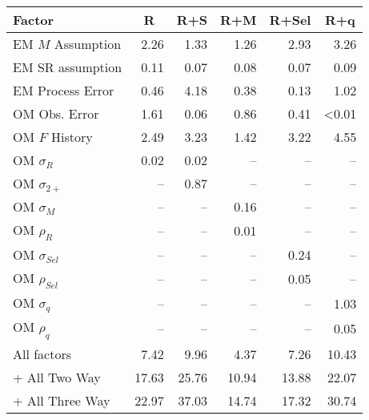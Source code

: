 \begin{center}
\begin{tabular}{lrrrrr}
\hline\hline
\multicolumn{1}{l}{Factor}&\multicolumn{1}{c}{R}&\multicolumn{1}{c}{R+S}&\multicolumn{1}{c}{R+M}&\multicolumn{1}{c}{R+Sel}&\multicolumn{1}{c}{R+q}\tabularnewline
\hline
EM $M$ Assumption& 2.26& 1.33& 1.26& 2.93& 3.26\tabularnewline
EM SR assumption& 0.11& 0.07& 0.08& 0.07& 0.09\tabularnewline
EM Process Error& 0.46& 4.18& 0.38& 0.13& 1.02\tabularnewline
OM Obs. Error& 1.61& 0.06& 0.86& 0.41&\textless  0.01\tabularnewline
OM $F$ History& 2.49& 3.23& 1.42& 3.22& 4.55\tabularnewline
OM $\sigma_R$& 0.02& 0.02&--&--&--\tabularnewline
OM $\sigma_{2+}$ &--& 0.87&--&--&--\tabularnewline
OM $\sigma_M$&--&--& 0.16&--&--\tabularnewline
OM $\rho_R$&--&--& 0.01&--&--\tabularnewline
OM $\sigma_{Sel}$&--&--&--& 0.24&--\tabularnewline
OM $\rho_{Sel}$&--&--&--& 0.05&--\tabularnewline
OM $\sigma_q$&--&--&--&--& 1.03\tabularnewline
OM $\rho_q$&--&--&--&--& 0.05\tabularnewline
All factors& 7.42& 9.96& 4.37& 7.26&10.43\tabularnewline
+ All Two Way&17.63&25.76&10.94&13.88&22.07\tabularnewline
+ All Three Way&22.97&37.03&14.74&17.32&30.74\tabularnewline
\hline
\end{tabular}\end{center}
